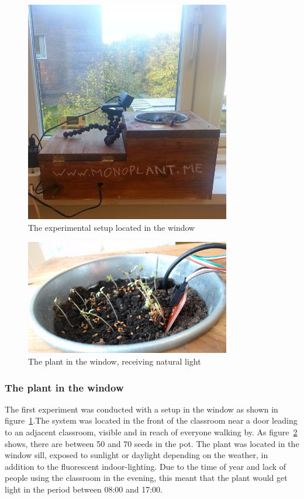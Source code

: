 \begin{figure}
\centering
\includegraphics[width=0.8\textwidth]{img/empiricalsetting/window.jpg}
\caption{The experimental setup located in the window}
\label{fig:windowplant}
\end{figure}

\begin{figure}
\centering
\includegraphics[width=0.8\textwidth]{img/empiricalsetting/windowsystem.jpg}
\caption{The plant in the window, receiving natural light}
\label{fig:windowsystemplant}
\end{figure}

\subsubsection*{The plant in the window}
The first experiment was conducted with a setup in the window as shown in figure~\ref{fig:windowplant}.The system was located in the front of the classroom near a door leading to an adjacent classroom, visible and in reach of everyone walking by. As figure~\ref{fig:windowsystemplant} shows, there are between 50 and 70 seeds in the pot. The plant was located in the window sill, exposed to sunlight or daylight depending on the weather, in addition to the fluorescent indoor-lighting. Due to the time of year and lack of people using the classroom in the evening, this meant that the plant would get light in the period between 08:00 and 17:00.

